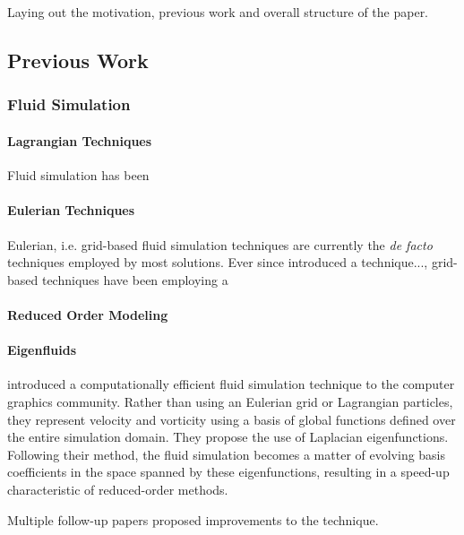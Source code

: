\chapter{\bevezetes}

Laying out the motivation, previous work and overall structure of the paper.

\section{Previous Work}
\subsection{Fluid Simulation}
\subsubsection*{Lagrangian Techniques}
Fluid simulation has been 
\subsubsection*{Eulerian Techniques}
Eulerian, i.e. grid-based fluid simulation techniques are currently the
\textit{de facto} techniques employed by most solutions.
Ever since \todo{[cite]} introduced a technique..., grid-based techniques
have been employing a 

\subsubsection{Reduced Order Modeling}

\subsubsection*{Eigenfluids}
\cite{dewitt} introduced a computationally efficient fluid simulation technique
to the computer graphics community. Rather than using an Eulerian grid or
Lagrangian particles, they represent velocity and vorticity using a basis of
global functions defined over the entire simulation domain. They propose the use
of Laplacian eigenfunctions. Following their method, the fluid simulation
becomes a matter of evolving basis coefficients in the space spanned by
these eigenfunctions, resulting in a speed-up characteristic of reduced-order
methods.

Multiple follow-up papers proposed improvements to the technique.

